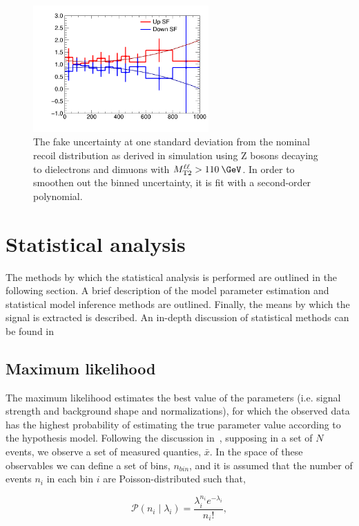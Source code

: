 \begin{figure}[h!] 
  \centering
  \includegraphics[width=0.6\textwidth]{figs/RecoilUpFit.png}
  \caption{The fake \ptmiss uncertainty at one standard deviation from the nominal recoil distribution as derived in simulation using Z bosons decaying to dielectrons and dimuons with $\mttll > 110\:\GeV$. In order to smoothen out the binned uncertainty, it is fit with a second-order polynomial.}
  \label{fig:recoilSF}
\end{figure}

\section{Statistical analysis}
\label{sec:stats}
The methods by which the statistical analysis is performed are outlined in the following section. A brief description of the model parameter estimation and statistical model inference methods are outlined. Finally, the means by which the signal is extracted is described. An in-depth discussion of statistical methods can be found in 

\subsection{Maximum likelihood}
\label{subsec:maxlikelihood}
The maximum likelihood estimates the best value of the parameters (i.e. signal strength and background shape and normalizations), for which the observed data has the highest probability of estimating the true parameter value according to the hypothesis model. Following the discussion in~\cite{}, supposing in a set of $N$ events, we observe a set of measured quanties, $\bar{x}$. In the space of these observables we can define a set of bins, $n_{bin}$, and it is assumed that the number of events $n_{i}$ in each bin $i$ are Poisson-distributed such that,

\begin{equation}
  \mathcal{P}(n_{i}\mid\lambda_{i}) = \frac{\lambda_{i}^{n_{i}}e^{-\lambda_{i}}}{n_{i}!},
\end{equation}

